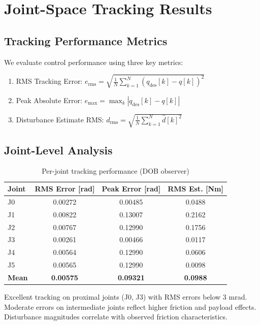 \section{Joint-Space Tracking Results}

\subsection{Tracking Performance Metrics}
We evaluate control performance using three key metrics:
\begin{enumerate}
    \item RMS Tracking Error: $e_{\text{rms}} = \sqrt{\frac{1}{N} \sum_{k=1}^{N} (q_{\text{des}}[k] - q[k])^2}$
    \item Peak Absolute Error: $e_{\max} = \max_k |q_{\text{des}}[k] - q[k]|$  
    \item Disturbance Estimate RMS: $d_{\text{rms}} = \sqrt{\frac{1}{N} \sum_{k=1}^{N} \hat{d}[k]^2}$
\end{enumerate}

\subsection{Joint-Level Analysis}
\begin{table}[H]
    \centering
    \caption{Per-joint tracking performance (DOB observer)}
    \begin{tabular}{lccc}
        \toprule
        \textbf{Joint} & \textbf{RMS Error [rad]} & \textbf{Peak Error [rad]} & \textbf{RMS Est. [Nm]} \\
        \midrule
        J0 & 0.00272 & 0.00485 & 0.0488 \\
        J1 & 0.00822 & 0.13007 & 0.2162 \\
        J2 & 0.00767 & 0.12990 & 0.1756 \\
        J3 & 0.00261 & 0.00466 & 0.0117 \\
        J4 & 0.00564 & 0.12990 & 0.0606 \\
        J5 & 0.00565 & 0.12990 & 0.0098 \\
        \midrule
        \textbf{Mean} & \textbf{0.00575} & \textbf{0.09321} & \textbf{0.0988} \\
        \bottomrule
    \end{tabular}
\end{table}

Excellent tracking on proximal joints (J0, J3) with RMS errors below 3 mrad. Moderate errors on intermediate joints reflect higher friction and payload effects. Disturbance magnitudes correlate with observed friction characteristics.

